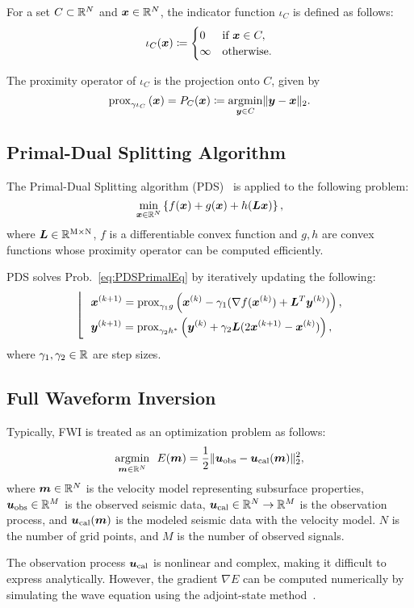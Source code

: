 For a set $C \subset \mathbb{R}^N$ and $\bm{x} \in \mathbb{R}^N$, the indicator function $\iota_C$ is defined as follows:
\begin{equation} \label{eq:IndicatorFunctionDefinitionEq} \iota_{C}(\bm{x}) \coloneq \begin{cases} 0 & \text{if } \bm{x} \in C, \\ \infty & \text{otherwise}. \end{cases} \end{equation}

The proximity operator of $\iota_C$ is the projection onto $C$, given by
\begin{equation} \label{eq:ProximityOperatorDefinitionWithIndicatorFunctionEq}
\mathrm{prox}_{ \gamma \iota_{C} }\left(\bm{x}\right) = P_C(\bm{x}) \coloneq \underset{\bm{y} \in C}{\mathrm{argmin}} \lVert \bm{y} - \bm{x} \rVert _2.
\end{equation}



\subsection{Primal-Dual Splitting Algorithm} \label{subsec:primal-dual-splitting-algorithm}

The Primal-Dual Splitting algorithm (PDS)~\cite{PDS0,PDS1,PDS2,PDS3} is applied to the following problem:
\begin{equation} \label{eq:PDSPrimalEq} \underset{ \bm{x} \in \mathbb{R}^N }{\mathrm{min}} \left\{ f(\bm{x}) + g(\bm{x}) + h(\bm{L} \bm{x}) \right\}, \end{equation}
where $\bm{L} \in \mathbb{R}^{\mathrm{M} \times \mathrm{N}}$, $f$ is a differentiable convex function and $g,h$ are convex functions whose proximity operator can be computed efficiently.

PDS solves Prob.~\eqref{eq:PDSPrimalEq} by iteratively updating the following:
\begin{equation} \label{eq:PDSSubStep} \left \lfloor \ \ \begin{aligned} & \bm{x}^{(k+1)} = \mathrm{prox}_{\gamma_1 g}\left(\bm{x}^{(k)} - \gamma_1( \nabla f(\bm{x}^{(k)}) + \bm{L}^T \bm{y}^{(k)} )\right), \\ & \bm{y}^{(k+1)} = \mathrm{prox}_{\gamma_2 h^*}\left(\bm{y}^{(k)} + \gamma_2 \bm{L} (2\bm{x}^{(k+1)} - \bm{x}^{(k)}) \right), \\ \end{aligned} \right. \end{equation}
where $\gamma_1, \gamma_2 \in \mathbb{R}$ are step sizes.





\subsection{Full Waveform Inversion} \label{subsec:full-waveform-inversion}

Typically, FWI is treated as an optimization problem as follows\cite{FWI0}:
\begin{equation} \label{eq:FWIObjective} \underset{\bm{m} \in \mathbb{R}^N}{\mathrm{argmin}} \ \ E(\bm{m}) = \frac {1} {2} \lVert  \bm{u}_{\mathrm{obs}} - \bm{u}_{\mathrm{cal}}(\bm{m})  \rVert _2^2, \end{equation}
where $\bm{m} \in \mathbb{R}^{N}$ is the velocity model representing subsurface properties, $\bm{u}_{\mathrm{obs}} \in \mathbb{R}^{M}$ is the observed seismic data, $\bm{u}_{\mathrm{cal}} \in \mathbb{R}^{N} \rightarrow \mathbb{R}^{M} $ is the observation process, and $\bm{u}_{\mathrm{cal}}(\bm{m})$ is the modeled seismic data with the velocity model.
$N$ is the number of grid points, and $M$ is the number of observed signals.

The observation process $\bm{u}_{\mathrm{cal}}$ is nonlinear and complex, making it difficult to express analytically.
However, the gradient $\nabla E$ can be computed numerically by simulating the wave equation using the adjoint-state method~\cite{FWI-gradient}.
